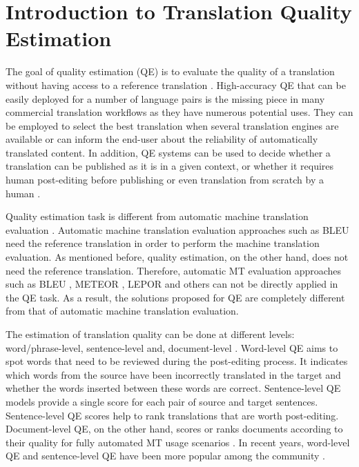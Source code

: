
\DeclareRobustCommand{\hlgreen}[1]{{\sethlcolor{asparagus}\hl{#1}}}

\DeclareRobustCommand{\hlred}[1]{{\sethlcolor{brickred}\hl{#1}}}

\newcommand{\hlc}[2][yellow]{{%
		\colorlet{foo}{#1}%
		\sethlcolor{foo}\hl{#2}}%
}


\chapter{\label{cha:qe_introduction}Introduction to Translation Quality Estimation}

The goal of quality estimation (QE) is to evaluate the quality of a translation without having access to a reference translation \autocite{specia-etal-2018-findings}. High-accuracy QE that can be easily deployed for a number of language pairs is the missing piece in many commercial translation workflows as they have numerous potential uses. They can be employed to select the best translation when several translation engines are available or can inform the end-user about the reliability of automatically translated content. In addition, QE systems can be used to decide whether a translation can be published as it is in a given context, or whether it requires human post-editing before publishing or even translation from scratch by a human  \autocite{kepler-etal-2019-openkiwi}. 

Quality estimation task is different from automatic machine translation evaluation \autocite{barrault-etal-2020-findings}. Automatic machine translation evaluation approaches such as BLEU \autocite{papineni-etal-2002-bleu} need the reference translation in order to perform the machine translation evaluation. As mentioned before, quality estimation, on the other hand, does not need the reference translation. Therefore, automatic MT evaluation approaches such as BLEU \autocite{papineni-etal-2002-bleu}, METEOR \autocite{banerjee-lavie-2005-meteor}, LEPOR \autocite{han-etal-2012-lepor} and others can not be directly applied in the QE task. As a result, the solutions proposed for QE are completely different from that of automatic machine translation evaluation.

The estimation of translation quality can be done at different levels: word/phrase-level, sentence-level and, document-level \autocite{ive-etal-2018-deepquest}. Word-level QE aims to spot words that need to be reviewed during the post-editing process. It indicates which words from the source have been incorrectly translated in the target and whether the words inserted between these words are correct. Sentence-level QE models provide a single score for each pair of source and target sentences. Sentence-level QE scores help to rank translations that are worth post-editing. Document-level QE, on the other hand, scores or ranks documents according to their quality for fully automated MT usage scenarios \autocite{ive-etal-2018-deepquest}. In recent years, word-level QE and sentence-level QE have been more popular among the community \autocite{specia-etal-2018-findings}.

